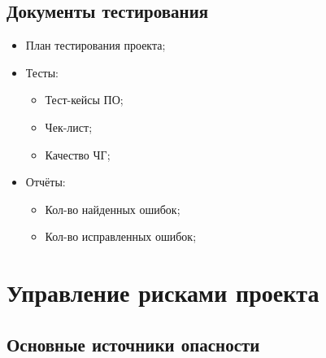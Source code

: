 \documentclass[a4paper,10pt]{article}
\begin{document}
    \subsection{Документы тестирования}

        \begin{itemize}
            \item План тестирования проекта;
            \item Тесты:
                \begin{itemize}
                    \item Тест-кейсы ПО;
                    \item Чек-лист;
                    \item Качество ЧГ;
                \end{itemize}
            \item Отчёты:
                \begin{itemize}
                \item Кол-во найденных ошибок;
                \item Кол-во исправленных ошибок;
                \end{itemize}

        \end{itemize}

\section{Управление рисками проекта}

\subsection{Основные источники опасности}
\end{document}
